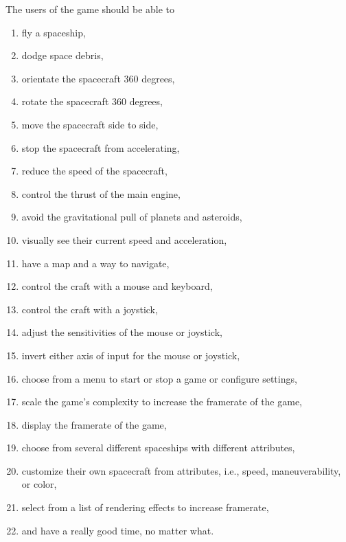 The users of the game should be able to

\begin{enumerate}

  \item fly a spaceship,

  \item dodge space debris,

  \item orientate the spacecraft 360 degrees,

  \item rotate the spacecraft 360 degrees,

  \item move the spacecraft side to side,

  \item stop the spacecraft from accelerating, 
  
  \item reduce the speed of the spacecraft, 

  \item control the thrust of the main engine,

  \item avoid the gravitational pull of planets and asteroids, 

  \item visually see their current speed and acceleration,

  \item have a map and a way to navigate,

  \item control the craft with a mouse and keyboard,

  \item control the craft with a joystick,

  \item adjust the sensitivities of the mouse or joystick,

  \item invert either axis of input for the mouse or joystick,

  \item choose from a menu to start or stop a game or configure settings,

  \item scale the game's complexity to increase the framerate of the game,

  \item display the framerate of the game,

  \item choose from several different spaceships with different attributes,

  \item customize their own spacecraft from attributes, i.e., speed, maneuverability, or color,

  \item select from a list of rendering effects to increase framerate,

  \item and have a really good time, no matter what.

\end{enumerate}

